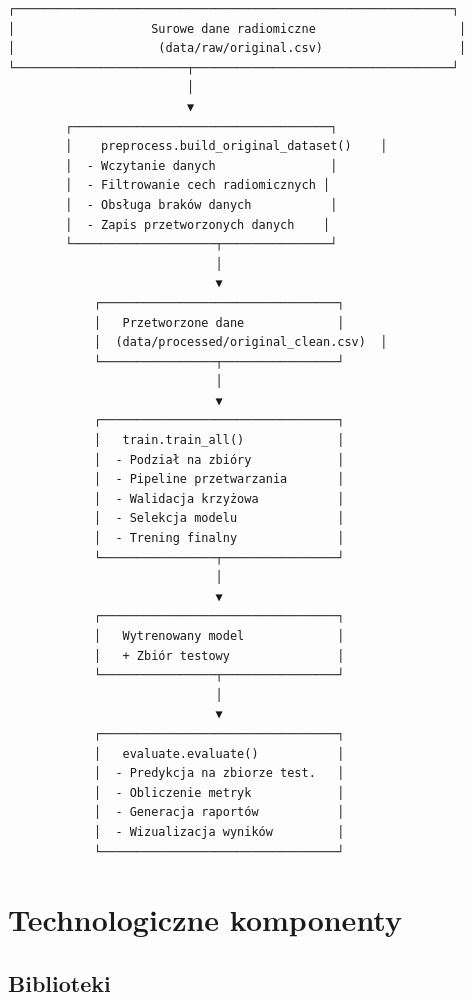 \documentclass[12pt]{article}
\begin{document}
\begin{verbatim}
┌─────────────────────────────────────────────────────────────┐
│                   Surowe dane radiomiczne                    │
│                    (data/raw/original.csv)                   │
└────────────────────────┬────────────────────────────────────┘
                         │
                         ▼
        ┌────────────────────────────────────┐
        │    preprocess.build_original_dataset()    │
        │  - Wczytanie danych                │
        │  - Filtrowanie cech radiomicznych │
        │  - Obsługa braków danych           │
        │  - Zapis przetworzonych danych    │
        └────────────────────┬───────────────┘
                             │
                             ▼
            ┌─────────────────────────────────┐
            │   Przetworzone dane             │
            │  (data/processed/original_clean.csv)  │
            └────────────────┬────────────────┘
                             │
                             ▼
            ┌─────────────────────────────────┐
            │   train.train_all()             │
            │  - Podział na zbióry            │
            │  - Pipeline przetwarzania       │
            │  - Walidacja krzyżowa           │
            │  - Selekcja modelu              │
            │  - Trening finalny              │
            └────────────────┬────────────────┘
                             │
                             ▼
            ┌─────────────────────────────────┐
            │   Wytrenowany model             │
            │   + Zbiór testowy               │
            └────────────────┬────────────────┘
                             │
                             ▼
            ┌─────────────────────────────────┐
            │   evaluate.evaluate()           │
            │  - Predykcja na zbiorze test.   │
            │  - Obliczenie metryk            │
            │  - Generacja raportów           │
            │  - Wizualizacja wyników         │
            └─────────────────────────────────┘
\end{verbatim}

\section{Technologiczne komponenty}

\subsection{Biblioteki}
\end{document}

